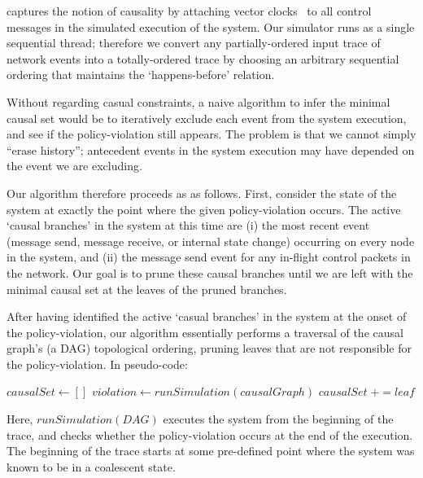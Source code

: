 \Simulator{} captures the notion of causality by attaching vector clocks~\cite{Mattern89virtualtime} to
all control messages in the simulated execution of the system. Our
simulator runs as a single sequential thread; therefore we convert any partially-ordered input trace
of network events into a totally-ordered trace by choosing an arbitrary
sequential ordering that maintains the `happens-before'
relation.

Without regarding casual constraints, a naive algorithm to infer the minimal
causal set would be to iteratively
exclude each event from the system execution, and see if the policy-violation
still appears. The problem is that we cannot simply ``erase history'';
antecedent events in the system execution may have depended on the event we
are excluding.

Our algorithm therefore proceeds as as follows. First, consider
the state of the system at exactly the point where the given policy-violation
occurs. The active `causal branches' in the system at this time are (i) the
most recent event (message send, message receive, or internal state change)
occurring on every node in the system, and (ii) the message send event for any
in-flight control packets in the network. Our goal is to prune these causal
branches until we are left with the minimal causal set at the leaves of the
pruned branches.


After having identified the active `casual branches' in the system at the
onset of the policy-violation, our algorithm essentially performs a
traversal of the causal graph's (a DAG) topological ordering, pruning leaves that are not
responsible for the policy-violation. In pseudo-code:

\begin{algorithmic}
\State $causalSet \gets []$ 
    \State $violation \gets runSimulation(causalGraph)$
        \State $causalSet\;+= leaf$
    \EndIf
\EndWhile
\end{algorithmic}

Here, $runSimulation(DAG)$ executes the system from the beginning of the
trace, and checks whether the policy-violation occurs at the end of the
execution. The beginning of the trace starts at some pre-defined point where
the system was known to be in a coalescent state.

